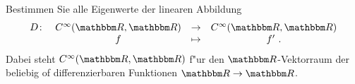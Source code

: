 \documentclass[a4,11pt]{article}
\begin{document}
{
\kopf
}

\musterlsgfrage

\newpage

\begin{aufgabe}[4 Punkte]
  Bestimmen Sie alle Eigenwerte der linearen Abbildung
  $$ \begin{array}{rccc}
       D \colon & C^\infty(\R,\R) &\to& C^\infty(\R,\R) \\
                & f &\mapsto& f' \ .
     \end{array} $$
     Dabei steht $C^\infty(\R,\R)$ f"ur den $\R$-Vektorraum der
     beliebig of differenzierbaren Funktionen $\R \to \R$.
\end{aufgabe}
\end{document}
